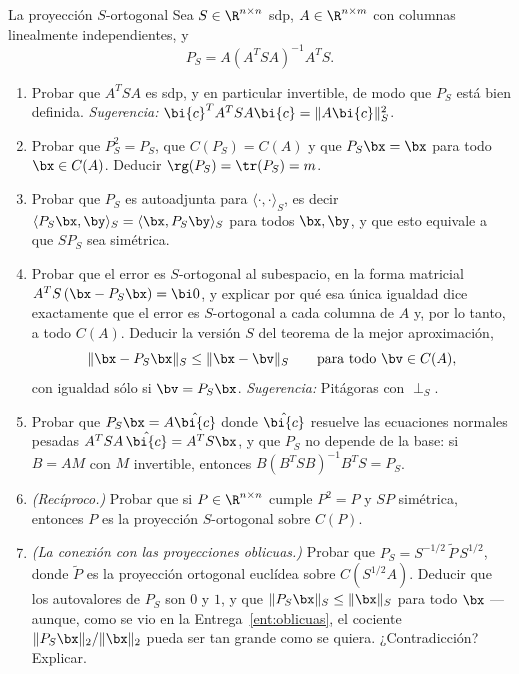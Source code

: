 \begin{entrega}{La proyección $S$-ortogonal}\label{ent:proyeccion-S}
Sea $S\in\R^{n\times n}$ sdp, $A\in\R^{n\times m}$ con columnas linealmente
independientes, y
\[
P_S=A(A^TSA)^{-1}A^TS .
\]

\begin{enumerate}[label=\textbf{(\alph*)},itemsep=3pt,topsep=4pt]
\item Probar que $A^TSA$ es sdp, y en particular invertible, de modo que
$P_S$ está bien definida. \emph{Sugerencia:} $\bi{c}^TA^TSA\bi{c}=\|A\bi{c}\|_S^2$.

\item Probar que $P_S^2=P_S$, que $C(P_S)=C(A)$ y que $P_S\bx=\bx$ para todo
$\bx\in C(A)$. Deducir $\rg(P_S)=\tr(P_S)=m$.

\item Probar que $P_S$ es autoadjunta para $\langle\cdot,\cdot\rangle_S$, es
decir $\langle P_S\bx,\by\rangle_S=\langle\bx,P_S\by\rangle_S$ para todos
$\bx,\by$, y que esto equivale a que $SP_S$ sea simétrica.

\item Probar que el error es $S$-ortogonal al subespacio, en la forma
matricial $A^TS\,(\bx-P_S\bx)=\bi 0$, y explicar por qué esa única igualdad
dice exactamente que el error es $S$-ortogonal a cada columna de $A$ y, por
lo tanto, a todo $C(A)$. Deducir la
versión $S$ del teorema de la mejor aproximación,
\[
\|\bx-P_S\bx\|_S\le\|\bx-\bv\|_S \qquad\text{para todo }\bv\in C(A),
\]
con igualdad sólo si $\bv=P_S\bx$. \emph{Sugerencia:} Pitágoras con
$\perp_S$.

\item Probar que $P_S\bx=A\hat{\bi{c}}$ donde $\hat{\bi{c}}$ resuelve las
ecuaciones normales pesadas $A^TSA\,\hat{\bi{c}}=A^TS\bx$, y que $P_S$ no
depende de la base: si $B=AM$ con $M$ invertible, entonces
$B(B^TSB)^{-1}B^TS=P_S$.

\item \emph{(Recíproco.)} Probar que si $P\in\R^{n\times n}$ cumple $P^2=P$ y
$SP$ simétrica, entonces $P$ es la proyección $S$-ortogonal sobre $C(P)$.

\item \emph{(La conexión con las proyecciones oblicuas.)} Probar que
$P_S=S^{-1/2}\,\widetilde P\,S^{1/2}$, donde $\widetilde P$ es la proyección
ortogonal euclídea sobre $C(S^{1/2}A)$. Deducir que los autovalores de $P_S$
son $0$ y $1$, y que $\|P_S\bx\|_S\le\|\bx\|_S$ para todo $\bx$ --- aunque,
como se vio en la Entrega~\ref{ent:oblicuas}, el cociente
$\|P_S\bx\|_2/\|\bx\|_2$ pueda ser tan grande como se quiera. ¿Contradicción?
Explicar.


\end{enumerate}
\end{entrega}
